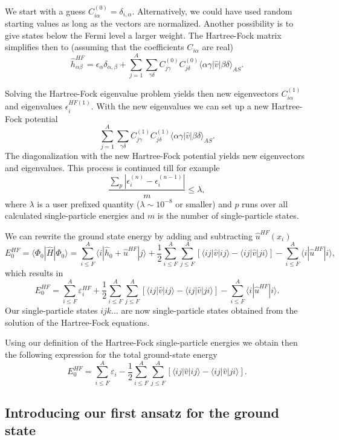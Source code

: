 We start with a guess
$C_{i\alpha}^{(0)}=\delta_{i,\alpha}$. Alternatively, we could have
used random starting values as long as the vectors are
normalized. Another possibility is to give states below the Fermi
level a larger weight.  The Hartree-Fock matrix simplifies then to
(assuming that the coefficients $C_{i\alpha} $ are real)
\[
\hat{h}_{\alpha\beta}^{HF}=\epsilon_{\alpha}\delta_{\alpha,\beta}+
\sum_{j = 1}^A\sum_{\gamma\delta} C_{j\gamma}^{(0)}C_{j\delta}^{(0)}\langle \alpha\gamma|\hat{v}|\beta\delta\rangle_{AS}.
\]




Solving the Hartree-Fock eigenvalue problem yields then new
eigenvectors $C_{i\alpha}^{(1)}$ and eigenvalues $\epsilon_i^{HF(1)}$.
With the new eigenvalues we can set up a new Hartree-Fock potential
\[
\sum_{j = 1}^A\sum_{\gamma\delta} C_{j\gamma}^{(1)}C_{j\delta}^{(1)}\langle \alpha\gamma|\hat{v}|\beta\delta\rangle_{AS}.
\]
The diagonalization with the new Hartree-Fock potential yields new
eigenvectors and eigenvalues.  This process is continued till for
example
\[
\frac{\sum_{p} |\epsilon_i^{(n)}-\epsilon_i^{(n-1)}|}{m} \le \lambda,  
\]
where $\lambda$ is a user prefixed quantity ($\lambda \sim 10^{-8}$ or
smaller) and $p$ runs over all calculated single-particle energies and
$m$ is the number of single-particle states.


We can rewrite the ground state energy by adding and subtracting
$\hat{u}^{HF}(x_i)$
\[
  E_0^{HF} =\langle \Phi_0 | \hat{H} | \Phi_0\rangle = 
\sum_{i\le F}^A \langle i | \hat{h}_0 +\hat{u}^{HF}| j\rangle+ \frac{1}{2}\sum_{i\le F}^A\sum_{j \le F}^A\left[\langle ij |\hat{v}|ij \rangle-\langle ij|\hat{v}|ji\rangle\right]-\sum_{i\le F}^A \langle i |\hat{u}^{HF}| i\rangle,
\]
which results in
\[
  E_0^{HF}
  = \sum_{i\le F}^A \varepsilon_i^{HF} + \frac{1}{2}\sum_{i\le F}^A\sum_{j \le F}^A\left[\langle ij |\hat{v}|ij \rangle-\langle ij|\hat{v}|ji\rangle\right]-\sum_{i\le F}^A \langle i |\hat{u}^{HF}| i\rangle.
\]
Our single-particle states $ijk\dots$ are now single-particle states
obtained from the solution of the Hartree-Fock equations.



Using our definition of the Hartree-Fock single-particle energies we
obtain then the following expression for the total ground-state energy
\[
  E_0^{HF}
  = \sum_{i\le F}^A \varepsilon_i - \frac{1}{2}\sum_{i\le F}^A\sum_{j \le F}^A\left[\langle ij |\hat{v}|ij \rangle-\langle ij|\hat{v}|ji\rangle\right].
\]


\subsection{Introducing our first ansatz for the ground state}

